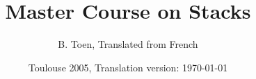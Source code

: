 \documentclass{memoir}
\title{Master Course on Stacks}
\author{B. Toen, Translated from French}
\date{Toulouse 2005, Translation version: \today}
\begin{document}
\maketitle
\tableofcontents{}


\end{document}
